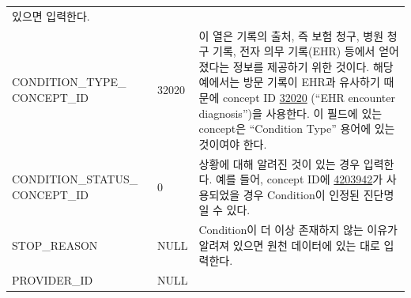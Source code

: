 \documentclass[10.5pt]{book}
\theoremstyle{definition}
\theoremstyle{definition}
\theoremstyle{definition}
\theoremstyle{remark}
\begin{document}
\begin{longtable}[]{@{}lll@{}}
\begin{minipage}[t]{0.48\columnwidth}
있으면 입력한다.\strut
\end{minipage}\tabularnewline
\begin{minipage}[t]{0.28\columnwidth}\raggedright\strut
CONDITION\_TYPE\_ CONCEPT\_ID\strut
\end{minipage} & \begin{minipage}[t]{0.16\columnwidth}\raggedright\strut
32020\strut
\end{minipage} & \begin{minipage}[t]{0.48\columnwidth}\raggedright\strut
이 열은 기록의 출처, 즉 보험 청구, 병원 청구 기록, 전자 의무 기록(EHR)
등에서 얻어졌다는 정보를 제공하기 위한 것이다. 해당 예에서는 방문 기록이
EHR과 유사하기 때문에 concept ID
\href{http://athena.ohdsi.org/search-terms/terms/32020}{32020} (``EHR
encounter diagnosis'')을 사용한다. 이 필드에 있는 concept은 ``Condition
Type'' 용어에 있는 것이여야 한다.\strut
\end{minipage}\tabularnewline
\begin{minipage}[t]{0.28\columnwidth}\raggedright\strut
CONDITION\_STATUS\_ CONCEPT\_ID\strut
\end{minipage} & \begin{minipage}[t]{0.16\columnwidth}\raggedright\strut
0\strut
\end{minipage} & \begin{minipage}[t]{0.48\columnwidth}\raggedright\strut
상황에 대해 알려진 것이 있는 경우 입력한다. 예를 들어, concept ID에
\href{http://athena.ohdsi.org/search-terms/terms/4203942}{4203942}가
사용되었을 경우 Condition이 인정된 진단명일 수 있다.\strut
\end{minipage}\tabularnewline
\begin{minipage}[t]{0.28\columnwidth}\raggedright\strut
STOP\_REASON\strut
\end{minipage} & \begin{minipage}[t]{0.16\columnwidth}\raggedright\strut
NULL\strut
\end{minipage} & \begin{minipage}[t]{0.48\columnwidth}\raggedright\strut
Condition이 더 이상 존재하지 않는 이유가 알려져 있으면 원천 데이터에
있는 대로 입력한다.\strut
\end{minipage}\tabularnewline
\begin{minipage}[t]{0.28\columnwidth}\raggedright\strut
PROVIDER\_ID\strut
\end{minipage} & \begin{minipage}[t]{0.16\columnwidth}\raggedright\strut
NULL\strut
\end{minipage} & \begin{minipage}[t]{0.48\columnwidth}\raggedright\strut

\end{minipage}
\end{longtable}
\end{document}
